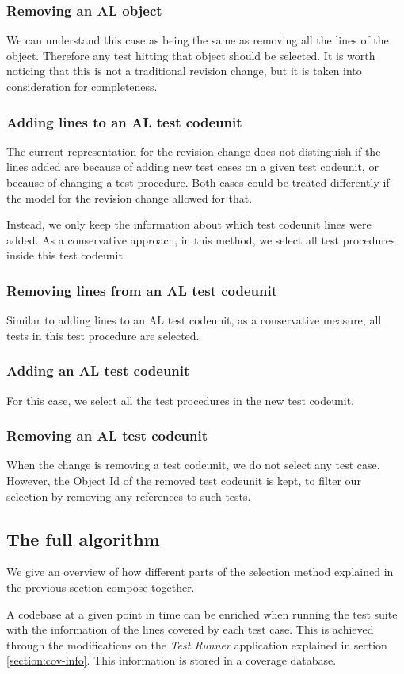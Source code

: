 \documentclass{article}
\begin{document}
\subsubsection{Removing an AL object}
We can understand this case as being the same as removing all the lines of the object. Therefore any test hitting that object should be selected. It is worth noticing that this is not a traditional revision change, but it is taken into consideration for completeness.
\subsubsection{Adding lines to an AL test codeunit}
The current representation for the revision change does not distinguish if the lines added are because of adding new test cases on a given test codeunit, or because of changing a test procedure. Both cases could be treated differently if the model for the revision change allowed for that.

Instead, we only keep the information about which test codeunit lines were added. As a conservative approach, in this method, we select all test procedures inside this test codeunit.
\subsubsection{Removing lines from an AL test codeunit}
Similar to adding lines to an AL test codeunit, as a conservative measure, all tests in this test procedure are selected.
\subsubsection{Adding an AL test codeunit}
For this case, we select all the test procedures in the new test codeunit.
\subsubsection{Removing an AL test codeunit}
When the change is removing a test codeunit, we do not select any test case. However, the Object Id of the removed test codeunit is kept, to filter our selection by removing any references to such tests.
\subsection{The full algorithm}
We give an overview of how different parts of the selection method explained in the previous section compose together.

A codebase at a given point in time can be enriched when running the test suite with the information of the lines covered by each test case. This is achieved through the modifications on the \emph{Test Runner} application explained in section \ref{section:cov-info}. This information is stored in a coverage database.
\end{document}
